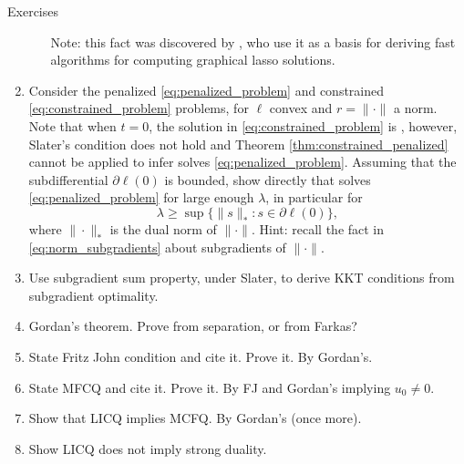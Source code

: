 \begin{xcb}{Exercises}
\begin{enumerate}[label=\thechapter.\arabic*]
\begin{enumerate}[label=\alph*.]
  \smallskip 
  Note: this fact was discovered by \cite{witten2011new, mazumder2012exact}, who
  use it as a basis for deriving fast algorithms for computing graphical lasso
  solutions.     
\end{enumerate}

\item \label{ex:penalized_limit}
  Consider the penalized \eqref{eq:penalized_problem} and constrained
  \eqref{eq:constrained_problem} problems, for $\ell$ convex and $r =
  \|\cdot\|$ a norm. Note that when $t = 0$, the solution in
  \eqref{eq:constrained_problem} is , however, Slater's
  condition does not hold and Theorem \ref{thm:constrained_penalized} cannot be
  applied to infer  solves
  \eqref{eq:penalized_problem}. Assuming that the subdifferential $\partial
  \ell(0)$ is bounded, show directly that  solves
  \eqref{eq:penalized_problem} for large enough $\lambda$, in particular for 
  \[
  \lambda \geq \sup \{ \|s\|_* : s \in \partial \ell(0) \},
  \]
  where $\|\cdot\|_*$ is the dual norm of $\|\cdot\|$. Hint: recall the fact in 
  \eqref{eq:norm_subgradients} about subgradients of $\|\cdot\|$.

\item \label{ex:subgradients_kkt}
  Use subgradient sum property, under Slater, to derive KKT conditions from 
  subgradient optimality.

\item Gordan's theorem. Prove from separation, or from Farkas? 

\item \label{ex:fritz_john_condition} 
  State Fritz John condition and cite it. Prove it. By Gordan's. 

\item \label{ex:mfcq} 
  State MFCQ and cite it. Prove it. By FJ and Gordan's implying $u_0 \not=
  0$. 

\item \label{ex:licq_implies_mfcq}
  Show that LICQ implies MCFQ. By Gordan's (once more). 

\item Show LICQ does not imply strong duality. 
\end{enumerate}
\end{xcb}
